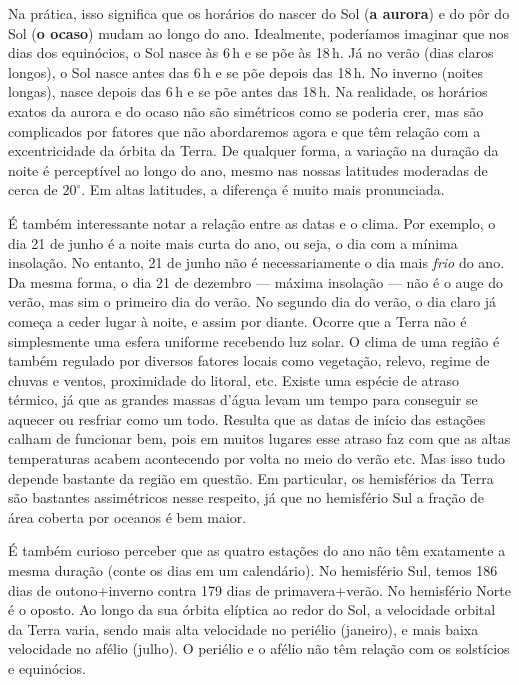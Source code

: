 Na prática, isso significa que os horários do nascer do Sol (\textbf{a aurora}) e do pôr do Sol (\textbf{o ocaso}) mudam ao longo do ano. Idealmente, poderíamos imaginar que nos dias dos equinócios, o Sol nasce às 6\,h e se põe às 18\,h. Já no verão (dias claros longos), o Sol nasce antes das 6\,h e se põe depois das 18\,h. No inverno (noites longas), nasce depois das 6\,h e se põe antes das 18\,h. Na realidade, os horários exatos da aurora e do ocaso não são simétricos como se poderia crer, mas são complicados por fatores que não abordaremos agora e que têm relação com a excentricidade da órbita da Terra. De qualquer forma, a variação na duração da noite é perceptível ao longo do ano, mesmo nas nossas latitudes moderadas de cerca de $20^{\circ}$. Em altas latitudes, a diferença é muito mais pronunciada.

É também interessante notar a relação entre as datas e o clima. Por exemplo, o dia 21 de junho é a noite mais curta do ano, ou seja, o dia com a mínima insolação. No entanto, 21 de junho não é necessariamente o dia mais \textit{frio} do ano. Da mesma forma, o dia 21 de dezembro --- máxima insolação --- não é o auge do verão, mas sim o primeiro dia do verão. No segundo dia do verão, o dia claro já começa a ceder lugar à noite, e assim por diante. Ocorre que a Terra não é simplesmente uma esfera uniforme recebendo luz solar. O clima de uma região é também regulado por diversos fatores locais como vegetação, relevo, regime de chuvas e ventos, proximidade do litoral, etc. Existe uma espécie de atraso térmico, já que as grandes massas d'água levam um tempo para conseguir se aquecer ou resfriar como um todo. Resulta que as datas de início das estações calham de funcionar bem, pois em muitos lugares esse atraso faz com que as altas temperaturas acabem acontecendo por volta no meio do verão etc. Mas isso tudo depende bastante da região em questão. Em particular, os hemisférios da Terra são bastantes assimétricos nesse respeito, já que no hemisfério Sul a fração de área coberta por oceanos é bem maior.

É também curioso perceber que as quatro estações do ano não têm exatamente a mesma duração (conte os dias em um calendário). No hemisfério Sul, temos 186 dias de outono+inverno contra 179 dias de primavera+verão. No hemisfério Norte é o oposto. Ao longo da sua órbita elíptica ao redor do Sol, a velocidade orbital da Terra varia, sendo mais alta velocidade no periélio (janeiro), e mais baixa velocidade no afélio (julho). O periélio e o afélio não têm relação com os solstícios e equinócios.

